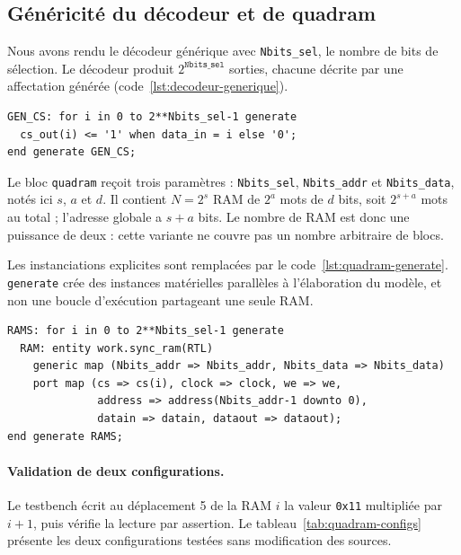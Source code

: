 \subsection{Généricité du décodeur et de quadram}

Nous avons rendu le décodeur générique avec \texttt{Nbits\_sel}, le nombre de bits de
sélection. Le décodeur produit $2^{\mathtt{Nbits\_sel}}$ sorties, chacune décrite par une
affectation générée (code~\ref{lst:decodeur-generique}).

\noindent\begin{minipage}{\linewidth}
\begin{lstlisting}[style=vhdl, caption={Décodage générique des signaux de sélection}, label={lst:decodeur-generique}]
GEN_CS: for i in 0 to 2**Nbits_sel-1 generate
  cs_out(i) <= '1' when data_in = i else '0';
end generate GEN_CS;
\end{lstlisting}
\end{minipage}\par

Le bloc \texttt{quadram} reçoit trois paramètres : \texttt{Nbits\_sel},
\texttt{Nbits\_addr} et \texttt{Nbits\_data}, notés ici $s$, $a$ et $d$.
Il contient $N=2^s$ RAM de $2^a$ mots de $d$ bits, soit $2^{s+a}$ mots au total ;
l'adresse globale a $s+a$ bits. Le nombre de RAM est donc une puissance de deux :
cette variante ne couvre pas un nombre arbitraire de blocs.

Les instanciations explicites sont remplacées par le code~\ref{lst:quadram-generate}.
\texttt{generate} crée des instances matérielles parallèles à l'élaboration du modèle,
et non une boucle d'exécution partageant une seule RAM.

\noindent\begin{minipage}{\linewidth}
\begin{lstlisting}[style=vhdl, caption={Instances de RAM créées par for ... generate}, label={lst:quadram-generate}]
RAMS: for i in 0 to 2**Nbits_sel-1 generate
  RAM: entity work.sync_ram(RTL)
    generic map (Nbits_addr => Nbits_addr, Nbits_data => Nbits_data)
    port map (cs => cs(i), clock => clock, we => we,
              address => address(Nbits_addr-1 downto 0),
              datain => datain, dataout => dataout);
end generate RAMS;
\end{lstlisting}
\end{minipage}\par

\paragraph{Validation de deux configurations.}
Le testbench écrit au déplacement 5 de la RAM $i$ la valeur \texttt{0x11} multipliée par $i+1$,
puis vérifie la lecture par assertion. Le tableau~\ref{tab:quadram-configs} présente
les deux configurations testées sans modification des sources.

